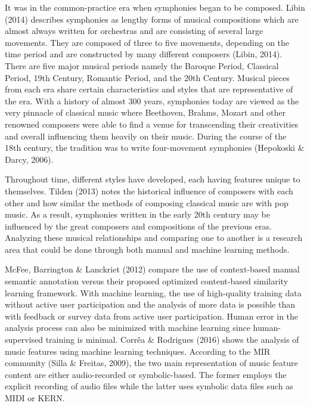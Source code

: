 It was in the common-practice era when symphonies began to be composed. Libin (2014) describes symphonies as lengthy forms of musical compositions which are almost always written for orchestras and are consisting of several large movements. They are composed of three to five movements, depending on the time period and are constructed by many different composers (Libin, 2014). There are five major musical periods namely the Baroque Period, Classical Period, 19th Century, Romantic Period, and the 20th Century. Musical pieces from each era share certain characteristics and styles that are representative of the era. With a history of almost 300 years, symphonies today are viewed as the very pinnacle of classical music where Beethoven, Brahms, Mozart and other renowned composers were able to find a venue for transcending their creativities and overall influencing them heavily on their music. During the course of the 18th century, the tradition was  to write four-movement symphonies (Hepokoski \& Darcy, 2006). 

Throughout time, different styles have developed, each having features unique to themselves. Tilden (2013) notes the historical influence of composers with each other and how similar the methods of composing classical music are with pop music.  As a result, symphonies written in the early 20th century may be influenced by the great composers and compositions of the previous eras. Analyzing these musical relationships and comparing one to another is a research area that could be done through both manual and machine learning methods.

McFee, Barrington \& Lanckriet (2012) compare the use of context-based manual semantic annotation versus their proposed optimized content-based similarity learning framework. With machine learning, the use of high-quality training data without active user participation and the analysis of more data is possible than with feedback or survey data from active user participation. Human error in the analysis process can also be minimized with machine learning since human-supervised training is minimal. Corrêa \& Rodrigues (2016) shows the analysis of music features using machine learning techniques. According to the MIR community (Silla \& Freitas, 2009), the two main representation of music feature content are either audio-recorded or symbolic-based. The former employs the explicit recording of audio files while the latter uses symbolic data files such as MIDI or KERN.

